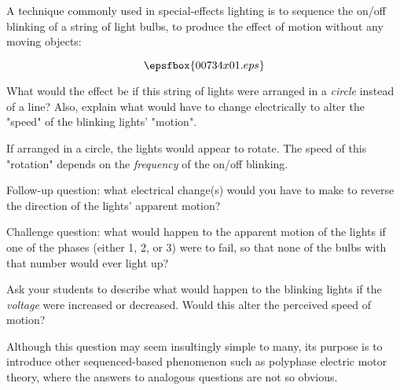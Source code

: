 

A technique commonly used in special-effects lighting is to sequence the on/off blinking of a string of light bulbs, to produce the effect of motion without any moving objects:

$$\epsfbox{00734x01.eps}$$

What would the effect be if this string of lights were arranged in a {\it circle} instead of a line?  Also, explain what would have to change electrically to alter the "speed" of the blinking lights' "motion".







If arranged in a circle, the lights would appear to rotate.  The speed of this "rotation" depends on the {\it frequency} of the on/off blinking.

\vskip 10pt

Follow-up question: what electrical change(s) would you have to make to reverse the direction of the lights' apparent motion?

\vskip 10pt

Challenge question: what would happen to the apparent motion of the lights if one of the phases (either 1, 2, or 3) were to fail, so that none of the bulbs with that number would ever light up?







Ask your students to describe what would happen to the blinking lights if the {\it voltage} were increased or decreased.  Would this alter the perceived speed of motion?

Although this question may seem insultingly simple to many, its purpose is to introduce other sequenced-based phenomenon such as polyphase electric motor theory, where the answers to analogous questions are not so obvious.




